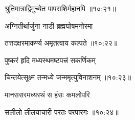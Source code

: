 
{\devanagarifont श्रुतिमात्राद्विमुच्येत पापराशिर्महानपि {॥१०:२१॥} \veg\dontdisplaylinenum }%


 

{\devanagarifont अग्नितीर्थार्जुना नाडी ब्रह्मघोषमनोरमा \thinspace{\dandab} \dontdisplaylinenum }%


{\devanagarifont तत्तदक्षरमाकर्ण्य अमृतत्वाय कल्पते {॥१०:२२॥} \veg\dontdisplaylinenum }%


 

{\devanagarifont पुष्करं हृदि मध्यस्थमष्टपत्त्रं सकर्णिकम् \thinspace{\dandab} \dontdisplaylinenum }%


{\devanagarifont चिन्तयेत्सूक्ष्म तन्मध्ये जन्ममृत्युविनाशनम् {॥१०:२३॥} \veg\dontdisplaylinenum }%


 

{\devanagarifont मानससरमध्यस्थं स हंसः कमलोपरि \thinspace{\dandab} \dontdisplaylinenum }%


{\devanagarifont सलीलो लीलयाचारी परतः परपारगः {॥१०:२४॥} \veg\dontdisplaylinenum }%


